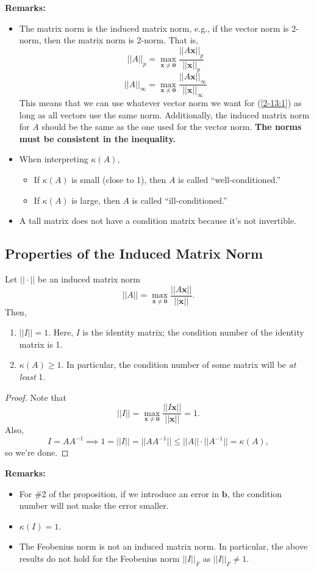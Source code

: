 \documentclass[letterpaper]{article}
\newcommand{\0}{\mathbf{0}}
\renewcommand{\b}{\mathbf{b}}
\newcommand{\x}{\mathbf{x}}
\begin{document}
\textbf{Remarks:}
\begin{itemize}
    \item The matrix norm is the induced matrix norm, e.g., if the vector norm is 2-norm, then the matrix norm is 2-norm. That is, 
    \[||A||_p = \max_{\x \neq \0} \frac{||A\x||_p}{||\x||_p}\]
    \[||A||_\infty = \max_{\x \neq \0} \frac{||A\x||_\infty}{||\x||_\infty}\]
    This means that we can use whatever vector norm we want for (\ref{2-13:1}) as long as all vectors use the same norm. Additionally, the induced matrix norm for $A$ should be the same as the one used for the vector norm. \textbf{The norms must be consistent in the inequality.}
    \item When interpreting $\kappa(A)$, 
    \begin{itemize}
        \item If $\kappa(A)$ is small (close to 1), then $A$ is called ``well-conditioned.''
        \item If $\kappa(A)$ is large, then $A$ is called ``ill-conditioned.''
    \end{itemize}
    \item A tall matrix does not have a condition matrix because it's not invertible. 
\end{itemize} 

\subsection{Properties of the Induced Matrix Norm}
\begin{proposition}
    Let $||\cdot||$ be an induced matrix norm \[||A|| = \max_{\x \neq \0} \frac{||A\x||}{||\x||}.\] Then, 
    \begin{enumerate}
        \item $||I|| = 1$. Here, $I$ is the identity matrix; the condition number of the identity matrix is 1. 
        \item $\kappa(A) \geq 1$. In particular, the condition number of some matrix will be \emph{at least} 1. 
    \end{enumerate}
\end{proposition}
\begin{proof}
    Note that 
    \[||I|| = \max_{\x \neq \0} \frac{||I\x||}{||\x||} = 1.\]
    Also, 
    \[I = AA^{-1} \implies 1 = ||I|| = ||AA^{-1}|| \leq ||A|| \cdot ||A^{-1}|| = \kappa(A),\]
    so we're done.
\end{proof}

\textbf{Remarks:}
\begin{itemize}
    \item For \#2 of the proposition, if we introduce an error in $\b$, the condition number will not make the error smaller.
    \item $\kappa(I) = 1$. 
    \item The Feobenius norm is not an induced matrix norm. In particular, the above results do not hold for the Feobenius norm $||I||_F$ as $||I||_F \neq 1$.  
\end{itemize}
\end{document}
